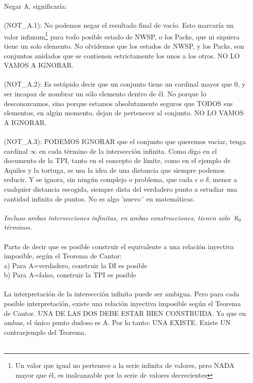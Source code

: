 	\noindent
	Negar A, significaría:\\\\
	(NOT\_A.1): No podemos negar el resultado final de vacío. Esto marcaría un valor infimum\footnote{Un valor que igual no pertenece a la serie infinita de valores, pero NADA mayor que él, es inalcanzable por la serie de valores decrecientes} para todo posible estado de NWSP, o los Packs, que ni siquiera tiene un solo elemento. No olvidemos que los estados de NWSP, y los Packs, son conjuntos anidados que se contienen estrictamente los unos a los otros. NO LO VAMOS A IGNORAR.\\\\
	(NOT\_A.2): Es estúpido decir que un conjunto tiene un cardinal mayor que $0$, y ser incapaz de nombrar un sólo elemento dentro de él. No porque lo desconozcamos, sino porque estamos absolutamente seguros que TODOS sus elementos, en algún momento, dejan de pertenecer al conjunto. NO LO VAMOS A IGNORAR.\\\\
	(NOT\_A.3): PODEMOS IGNORAR que el conjunto que queremos vaciar, tenga cardinal $\infty$ en cada término de la intersección infinita. Como digo en el documento de la TPI, tanto en el concepto de límite, como en el ejemplo de Aquiles y la tortuga, se usa la idea de una distancia que siempre podemos reducir. Y se ignora, sin ningún complejo o problema, que cada $\epsilon$ o $\delta$, menor a cualquier distancia escogida, siempre dista del verdadero punto a estudiar una cantidad infinita de puntos. No es algo 'nuevo´ en matemáticas.\\\\
	
	\noindent
	\textit{Incluso ambas intersecciones infinitas, en ambas construcciones, tienen solo $\aleph_{0}$ términos.}\\\\
	
	\noindent
	Parto de decir que es posible construir el equivalente a una relación inyectiva imposible, según el Teorema de Cantor:\\
	a) Para A=verdadero, construir la DI es posible\\
	b) Para A=falso, construir la TPI es posible\\\\
	
	\noindent
	La interpretación de la intersección infinita puede ser ambigua. Pero para cada posible interpretación, existe una relación inyectiva imposible según el Teorema de Cantor. UNA DE LAS DOS DEBE ESTAR BIEN CONSTRUIDA. Ya que en ambas, el único punto dudoso es A. Por lo tanto: UNA EXISTE. Existe UN contraejemplo del Teorema.\\\\
	
